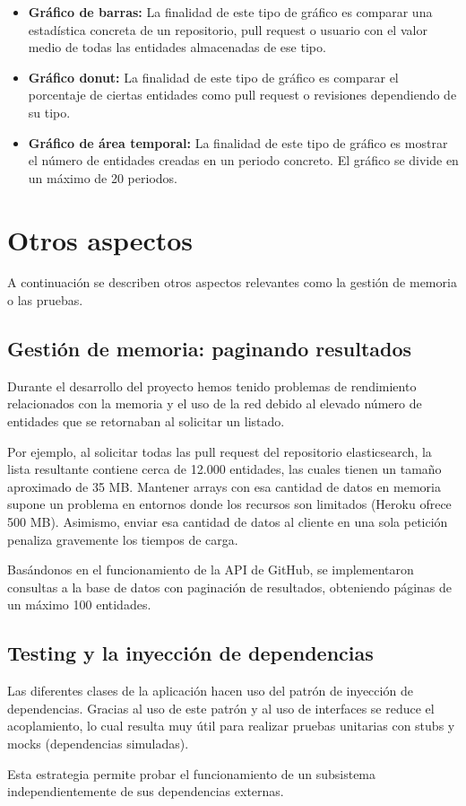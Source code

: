 \begin{itemize}
\tightlist
	\item \textbf{Gráfico de barras:} La finalidad de este tipo de gráfico es comparar una estadística concreta de un repositorio, pull request o usuario con el valor medio de todas las entidades almacenadas de ese tipo.
	\item \textbf{Gráfico donut:} La finalidad de este tipo de gráfico es comparar el porcentaje de ciertas entidades como pull request o revisiones dependiendo de su tipo.
	\item \textbf{Gráfico de área temporal:} La finalidad de este tipo de gráfico es mostrar  el número de entidades creadas en un periodo concreto. El gráfico se divide en un máximo de 20 periodos.
\end{itemize}



\section{Otros aspectos}

A continuación se describen otros aspectos relevantes como la gestión de memoria o las pruebas.

\subsection{Gestión de memoria: paginando resultados}

Durante el desarrollo del proyecto hemos tenido problemas de rendimiento relacionados con la memoria y el uso de la red debido al elevado número de entidades que se retornaban al solicitar un listado.

Por ejemplo, al solicitar todas las pull request del repositorio elasticsearch, la lista resultante contiene cerca de 12.000 entidades, las cuales tienen un tamaño aproximado de 35 MB. Mantener arrays con esa cantidad de datos en memoria supone un problema en entornos donde los recursos son limitados (Heroku ofrece 500 MB). Asimismo, enviar esa cantidad de datos al cliente en una sola petición penaliza gravemente los tiempos de carga.

Basándonos en el funcionamiento de la API de GitHub, se implementaron consultas a la base de datos con paginación de resultados, obteniendo páginas de un máximo 100 entidades.

\subsection{Testing y la inyección de dependencias}

Las diferentes clases de la aplicación hacen uso del patrón de inyección de dependencias. Gracias al uso de este patrón y al uso de interfaces se reduce el acoplamiento, lo cual resulta muy útil para realizar pruebas unitarias con stubs y mocks (dependencias simuladas).

Esta estrategia permite probar el funcionamiento de un subsistema independientemente de sus dependencias externas.

